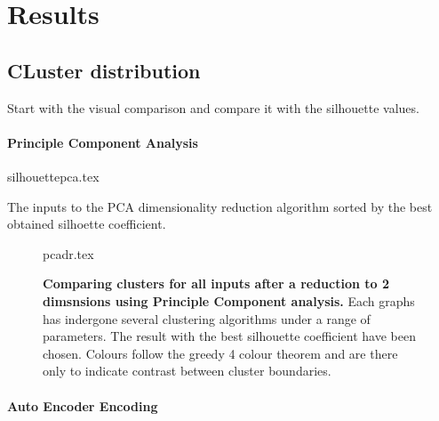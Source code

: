\section{Results}
% 

\subsection{CLuster distribution}

Start with the visual comparison and compare it with the silhouette values. 




\paragraph*{Principle Component Analysis}


\begin{table}[H]
    \centering
        {silhouettepca.tex}
        \caption{The inputs to the PCA dimensionality reduction algorithm sorted by the best obtained silhoette coefficient.  }
        \label{tab:pcasil}
\end{table}



\begin{landscape}
\begin{figure}[H]
    {pcadr.tex}
    \caption{\textbf{Comparing clusters for all inputs after a reduction to 2 dimsnsions using Principle Component analysis.}
    Each graphs has indergone several clustering algorithms under a range of parameters. The result with the best silhouette coefficient have been chosen. Colours follow the greedy 4 colour theorem and are there only to indicate contrast between cluster boundaries.}
    \label{fig:pcavis}
\end{figure}
\end{landscape}






\paragraph*{Auto Encoder Encoding}

